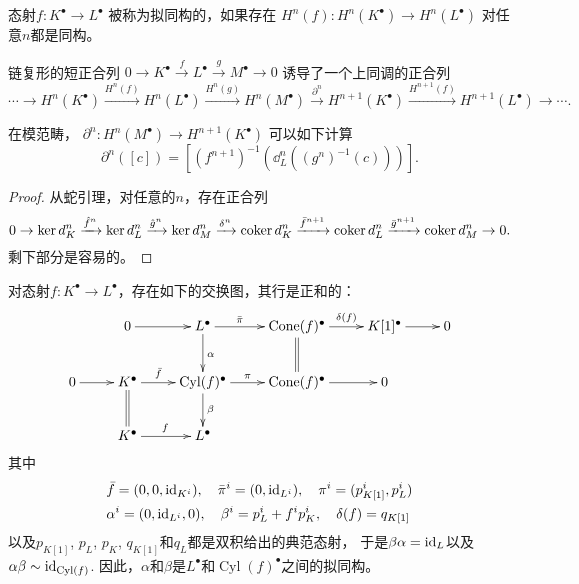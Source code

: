 \begin{para}[拟同构]
	态射$f:K^\bullet\to L^\bullet$ 被称为拟同构的，如果存在
     $H^n(f):H^n(K^\bullet)\to H^n(L^\bullet)$ 对任意$n$都是同构。
\end{para}

\begin{pro}\label{pro:1.9}
	链复形的短正合列 $0\to K^\bullet\xrightarrow{f}L^\bullet\xrightarrow{g}M^\bullet\to 0$ 
    诱导了一个上同调的正合列
	\[
		\cdots\to H^n(K^\bullet)\xrightarrow{H^n(f)}H^n(L^\bullet)\xrightarrow{H^n(g)}H^n(M^\bullet)\xrightarrow{\partial^n}H^{n+1}(K^\bullet)\xrightarrow{H^{n+1}(f)}H^{n+1}(L^\bullet)\to\cdots.
	\]
\end{pro}

在模范畴， $\partial^n:H^n(M^\bullet)\to H^{n+1}(K^\bullet)$ 可以如下计算
\[
	\partial^n([c])=\left[(f^{n+1})^{-1}\left(\dd^n_L\left((g^n)^{-1}(c)\right)\right)\right].
\]

\begin{proof}
	从蛇引理，对任意的$n$，存在正合列
	\[
		0\to \ker d_K^n\xrightarrow{\hat f^n} \ker d_L^n
		\xrightarrow{\hat g^n}
		\ker d_M^n \xrightarrow{\delta^n}
		\operatorname{coker} d_K^n\xrightarrow{\bar f^{n+1}} \operatorname{coker} d_L^n\xrightarrow{\bar g^{n+1}} \operatorname{coker} d_M^n \to 0.
	\]
	剩下部分是容易的。
\end{proof}



\begin{pro}\label{pro:1.12}
	对态射$f:K^\bullet \to L^\bullet$，存在如下的交换图，其行是正和的：
	\begin{equation}\label{tri}
		\xymatrix{
			& 0\ar[r] & L^\bullet \ar[r]^-{\bar\pi}\ar[d]^\alpha & \Cone(f)^\bullet \ar[r]^-{\delta(f)}\ar@{=}[d]
			& K[1]^\bullet \ar[r] & 0\\
			0 \ar[r] & K^\bullet \ar[r]^-{\bar f}\ar@{=}[d] & \operatorname{Cyl}(f)^\bullet \ar[r]^-\pi\ar[d]^\beta 
			&\Cone(f)^\bullet \ar[r] & 0 & \\
			& K^\bullet \ar[r]^f & L^\bullet & & &
		}
	\end{equation}
	其中
	\[
		\begin{aligned}
		&\bar f = (0,0,\operatorname{id}_{K^i}),\quad\bar\pi^i=(0,\operatorname{id}_{L^i}),\quad \pi^i=(p^i_{K[1]},p^i_{L})\\
		&\alpha^i = (0,\operatorname{id}_{L^i},0),\quad \beta^i= p^i_{L} + f^i p^i_K,\quad \delta(f)=q_{K[1]}
		\end{aligned}
	\]
	以及$p_{K[1]}$, $p_{L}$, $p_{K}$, $q_{K[1]}$和$q_L$都是双积给出的典范态射，
    于是$\beta\alpha=\operatorname{id}_L$以及$\alpha\beta\sim \operatorname{id}_{\operatorname{Cyl}(f)}$.
	因此，$\alpha$和$\beta$是$L^\bullet$和$\operatorname{Cyl}(f)^\bullet$之间的拟同构。
\end{pro}

